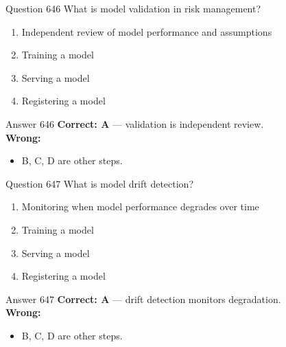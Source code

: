 \documentclass[aspectratio=169,11pt]{beamer}
\begin{document}
	\begin{frame}{Question 646}
		What is model validation in risk management?
		\begin{enumerate}[label=\Alph*.]
			\item Independent review of model performance and assumptions
			\item Training a model
			\item Serving a model
			\item Registering a model
		\end{enumerate}
	\end{frame}
	\begin{frame}{Answer 646}
		\textbf{Correct: A} --- validation is independent review.\\
		\vspace{0.5em}
		\textbf{Wrong:}
		\begin{itemize}
			\item B, C, D are other steps.
		\end{itemize}
	\end{frame}
	
	\begin{frame}{Question 647}
		What is model drift detection?
		\begin{enumerate}[label=\Alph*.]
			\item Monitoring when model performance degrades over time
			\item Training a model
			\item Serving a model
			\item Registering a model
		\end{enumerate}
	\end{frame}
	\begin{frame}{Answer 647}
		\textbf{Correct: A} --- drift detection monitors degradation.\\
		\vspace{0.5em}
		\textbf{Wrong:}
		\begin{itemize}
			\item B, C, D are other steps.
		\end{itemize}
	\end{frame}
	
\end{document}
